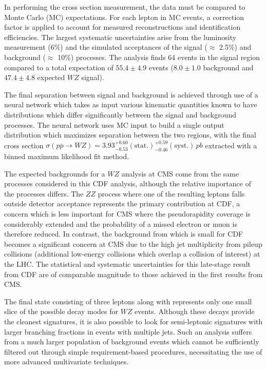 In performing the cross section measurement, the data must be compared to Monte Carlo (MC) expectations.  For each lepton in MC events, a correction factor is applied to account for measured reconstructions and identification efficiencies.  The largest systematic uncertainties arise from the luminosity measurement (6\%) and the simulated acceptances of the signal ($\approx$ 2.5\%) and background ($\approx$  10\%) processes.  The analysis finds 64 events in the signal region compared to a total expectation of $55.4 \pm 4.9$ events ($8.0 \pm 1.0$ background and $47.4 \pm 4.8$ expected $WZ$ signal).

The final separation between signal and background is achieved through use of a neural network which takes as input various kinematic quantities known to have distributions which differ significantly between the signal and background processes.  The neural network uses MC input to build a single output distribution which maximizes separation between the two regions, with the final cross section $\sigma(p\bar{p} \to WZ) = 3.93^{+0.60}_{-0.53}(\text{stat.})^{+0.59}_{-0.46}(\text{syst.})\,\si{pb}$ extracted with a binned maximum likelihood fit method.

The expected backgrounds for a $WZ$ analysis at CMS come from the same processes considered in this CDF analysis, although the relative importance of the processes differs.  The $ZZ$ process where one of the resulting leptons falls outside detector acceptance represents the primary contribution at CDF, a concern which is less important for CMS where the pseudorapidity coverage is considerably extended and the probability of a missed electron or muon is therefore reduced.  In contrast, the background from \Zjets which is small for CDF becomes a significant concern at CMS due to the high jet multiplicity from pileup collisions (additional low-energy collisions which overlap a collision of interest) at the LHC.  The statistical and systematic uncertainties for this late-stage result from CDF are of comparable magnitude to those achieved in the first results from CMS.

The final state consisting of three leptons along with \MET{} represents only one small slice of the possible decay modes for $WZ$ events.  Although these decays provide the cleanest signatures, it is also possible to look for semi-leptonic signatures with larger branching fractions in events with multiple jets.  Such an analysis suffers from a much larger population of background events which cannot be sufficiently filtered out through simple requirement-based procedures, necessitating the use of more advanced multivariate techniques.  

